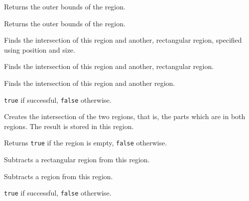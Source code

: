 \label{wxregiongetbox}


Returns the outer bounds of the region.


Returns the outer bounds of the region.

\label{wxregionintersect}


Finds the intersection of this region and another, rectangular region, specified using position and size.


Finds the intersection of this region and another, rectangular region.


Finds the intersection of this region and another region.


{\tt true} if successful, {\tt false} otherwise.


Creates the intersection of the two regions, that is, the parts which are in both regions. The result
is stored in this region.

\label{wxregionisempty}


Returns {\tt true} if the region is empty, {\tt false} otherwise.

\label{wxregionsubstract}


Subtracts a rectangular region from this region.


Subtracts a region from this region.


{\tt true} if successful, {\tt false} otherwise.


